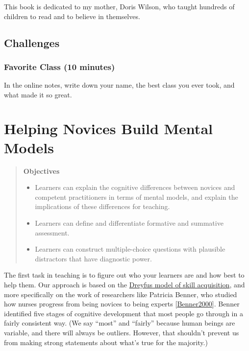 \documentclass[10pt,statementpaper]{memoir}
\providecommand{\tightlist}{%
  \setlength{\itemsep}{0pt}\setlength{\parskip}{0pt}}
\begin{document}
This book is dedicated to my mother, Doris Wilson, who taught hundreds
of children to read and to believe in themselves.

\section{Challenges}\label{challenges}

\subsection*{Favorite Class (10
minutes)}\label{favorite-class-10-minutes}

In the online notes, write down your name, the best class you ever took,
and what made it so great.

\chapter{Helping Novices Build Mental
Models}\label{helping-novices-build-mental-models}

\begin{quote}
\textbf{Objectives}

\begin{itemize}
\tightlist
\item
  Learners can explain the cognitive differences between novices and
  competent practitioners in terms of mental models, and explain the
  implications of these differences for teaching.
\item
  Learners can define and differentiate formative and summative
  assessment.
\item
  Learners can construct multiple-choice questions with plausible
  distractors that have diagnostic power.
\end{itemize}
\end{quote}

The first task in teaching is to figure out who your learners are and
how best to help them. Our approach is based on the
\href{https://en.wikipedia.org/wiki/Dreyfus_model_of_skill_acquisition}{Dreyfus
model of skill acquisition}, and more specifically on the work of
researchers like Patricia Benner, who studied how nurses progress from
being novices to being experts
{[}\href{biblio.html\#benner-expertise}{Benner2000}{]}. Benner
identified five stages of cognitive development that most people go
through in a fairly consistent way. (We say ``most'' and ``fairly''
because human beings are variable, and there will always be outliers.
However, that shouldn't prevent us from making strong statements about
what's true for the majority.)
\end{document}
